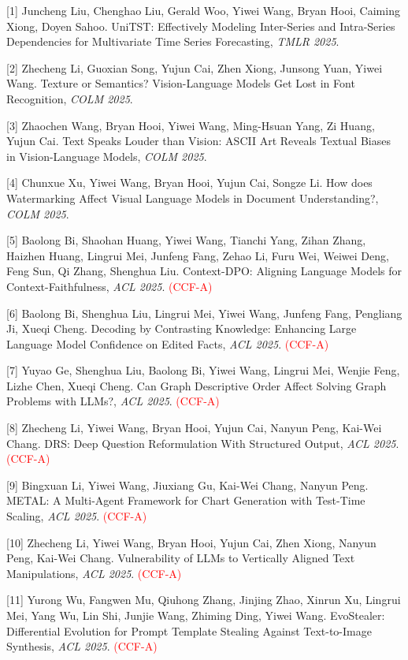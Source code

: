 [1] Juncheng Liu, Chenghao Liu, Gerald Woo, Yiwei Wang, Bryan Hooi, Caiming Xiong, Doyen Sahoo. UniTST: Effectively Modeling Inter-Series and Intra-Series Dependencies for Multivariate Time Series Forecasting, \textit{TMLR 2025}.

[2] Zhecheng Li, Guoxian Song, Yujun Cai, Zhen Xiong, Junsong Yuan, Yiwei Wang. Texture or Semantics? Vision-Language Models Get Lost in Font Recognition, \textit{COLM 2025}.

[3] Zhaochen Wang, Bryan Hooi, Yiwei Wang, Ming-Hsuan Yang, Zi Huang, Yujun Cai. Text Speaks Louder than Vision: ASCII Art Reveals Textual Biases in Vision-Language Models, \textit{COLM 2025}.

[4] Chunxue Xu, Yiwei Wang, Bryan Hooi, Yujun Cai, Songze Li. How does Watermarking Affect Visual Language Models in Document Understanding?, \textit{COLM 2025}.

[5] Baolong Bi, Shaohan Huang, Yiwei Wang, Tianchi Yang, Zihan Zhang, Haizhen Huang, Lingrui Mei, Junfeng Fang, Zehao Li, Furu Wei, Weiwei Deng, Feng Sun, Qi Zhang, Shenghua Liu. Context-DPO: Aligning Language Models for Context-Faithfulness, \textit{ACL 2025}. \textcolor{red}{(CCF-A)}

[6] Baolong Bi, Shenghua Liu, Lingrui Mei, Yiwei Wang, Junfeng Fang, Pengliang Ji, Xueqi Cheng. Decoding by Contrasting Knowledge: Enhancing Large Language Model Confidence on Edited Facts, \textit{ACL 2025}. \textcolor{red}{(CCF-A)}

[7] Yuyao Ge, Shenghua Liu, Baolong Bi, Yiwei Wang, Lingrui Mei, Wenjie Feng, Lizhe Chen, Xueqi Cheng. Can Graph Descriptive Order Affect Solving Graph Problems with LLMs?, \textit{ACL 2025}. \textcolor{red}{(CCF-A)}

[8] Zhecheng Li, Yiwei Wang, Bryan Hooi, Yujun Cai, Nanyun Peng, Kai-Wei Chang. DRS: Deep Question Reformulation With Structured Output, \textit{ACL 2025}. \textcolor{red}{(CCF-A)}

[9] Bingxuan Li, Yiwei Wang, Jiuxiang Gu, Kai-Wei Chang, Nanyun Peng. METAL: A Multi-Agent Framework for Chart Generation with Test-Time Scaling, \textit{ACL 2025}. \textcolor{red}{(CCF-A)}

[10] Zhecheng Li, Yiwei Wang, Bryan Hooi, Yujun Cai, Zhen Xiong, Nanyun Peng, Kai-Wei Chang. Vulnerability of LLMs to Vertically Aligned Text Manipulations, \textit{ACL 2025}. \textcolor{red}{(CCF-A)}

[11] Yurong Wu, Fangwen Mu, Qiuhong Zhang, Jinjing Zhao, Xinrun Xu, Lingrui Mei, Yang Wu, Lin Shi, Junjie Wang, Zhiming Ding, Yiwei Wang. EvoStealer: Differential Evolution for Prompt Template Stealing Against Text-to-Image Synthesis, \textit{ACL 2025}. \textcolor{red}{(CCF-A)}


